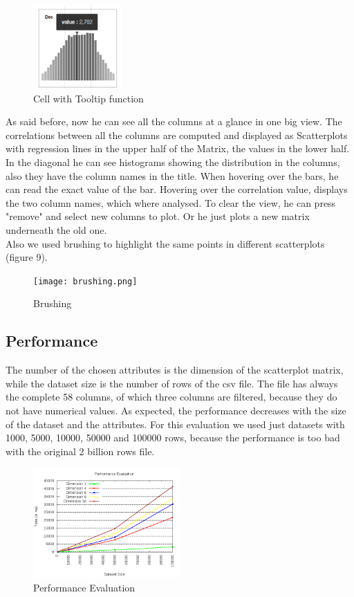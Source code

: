 \documentclass{vgtc}                          %
\begin{document}
\begin{figure}[H]
\includegraphics[width=0.3\textwidth]{tooltip.png}
\centering
\caption{Cell with Tooltip function}
\end{figure}

As said before, now he can see all the columns at a glance in one big view. The correlations between all the columns are computed and displayed as Scatterplots with regression lines in the upper half of the Matrix, the values in the lower half. In the diagonal he can see histograms showing the distribution in the columns, also they have the column names in the title. When hovering over the bars, he can read the exact value of the bar. Hovering over the correlation value, displays the two column names, which where analysed. To clear the view, he can press "remove" and select new columns to plot. Or he just plots a new matrix underneath the old one.\\
Also we used brushing to highlight the same points in different scatterplots (figure 9).
\begin{figure}[H]
\texttt{[image: brushing.png]}
\centering
\caption{Brushing}
\end{figure}


\subsection{Performance}
The number of the chosen attributes is the dimension of the scatterplot matrix, while the dataset size is the number of rows of the csv file. The file has always the complete 58 columns, of which three columns are filtered, because they do not have numerical values. As expected, the performance decreases with the size of the dataset and the attributes. For this evaluation we used just datasets with 1000, 5000, 10000, 50000 and 100000 rows, because the performance is too bad with the original 2 billion rows file.

\begin{figure}[H]
\includegraphics[width=0.5\textwidth]{performance.png}
\centering
\caption{Performance Evaluation}
\end{figure}
\end{document}
